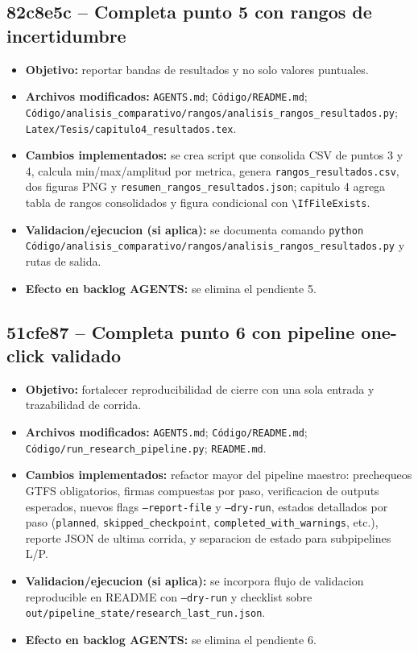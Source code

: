 \documentclass[11pt]{article}
\begin{document}
\subsection{82c8e5c -- Completa punto 5 con rangos de incertidumbre}
\begin{itemize}
  \item \textbf{Objetivo:} reportar bandas de resultados y no solo valores puntuales.
  \item \textbf{Archivos modificados:} \texttt{AGENTS.md}; \texttt{C\'odigo/README.md}; \texttt{C\'odigo/analisis\_comparativo/rangos/analisis\_rangos\_resultados.py}; \texttt{Latex/Tesis/capitulo4\_resultados.tex}.
  \item \textbf{Cambios implementados:} se crea script que consolida CSV de puntos 3 y 4, calcula min/max/amplitud por metrica, genera \texttt{rangos\_resultados.csv}, dos figuras PNG y \texttt{resumen\_rangos\_resultados.json}; capitulo 4 agrega tabla de rangos consolidados y figura condicional con \texttt{\textbackslash IfFileExists}.
  \item \textbf{Validacion/ejecucion (si aplica):} se documenta comando \texttt{python C\'odigo/analisis\_comparativo/rangos/analisis\_rangos\_resultados.py} y rutas de salida.
  \item \textbf{Efecto en backlog AGENTS:} se elimina el pendiente 5.
\end{itemize}

\subsection{51cfe87 -- Completa punto 6 con pipeline one-click validado}
\begin{itemize}
  \item \textbf{Objetivo:} fortalecer reproducibilidad de cierre con una sola entrada y trazabilidad de corrida.
  \item \textbf{Archivos modificados:} \texttt{AGENTS.md}; \texttt{C\'odigo/README.md}; \texttt{C\'odigo/run\_research\_pipeline.py}; \texttt{README.md}.
  \item \textbf{Cambios implementados:} refactor mayor del pipeline maestro: prechequeos GTFS obligatorios, firmas compuestas por paso, verificacion de outputs esperados, nuevos flags \texttt{--report-file} y \texttt{--dry-run}, estados detallados por paso (\texttt{planned}, \texttt{skipped\_checkpoint}, \texttt{completed\_with\_warnings}, etc.), reporte JSON de ultima corrida, y separacion de estado para subpipelines L/P.
  \item \textbf{Validacion/ejecucion (si aplica):} se incorpora flujo de validacion reproducible en README con \texttt{--dry-run} y checklist sobre \texttt{out/pipeline\_state/research\_last\_run.json}.
  \item \textbf{Efecto en backlog AGENTS:} se elimina el pendiente 6.
\end{itemize}
\end{document}
